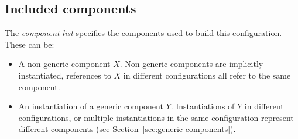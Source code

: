 \documentclass[11pt,letterpaper]{article}
\begin{document}
\subsection{Included components}
\label{sec:config-components}

The \emph{component-list} specifies the components used to build this
configuration. These can be:
\begin{itemize}
\item A non-generic component $X$. Non-generic components are implicitly
instantiated, references to $X$ in different configurations all
refer to the same component.

\item An instantiation of a generic component $Y$. Instantiations of $Y$ in
different configurations, or multiple instantiations in the same
configuration represent different components (see
Section~\ref{sec:generic-components}).
\end{itemize}
\end{document}
